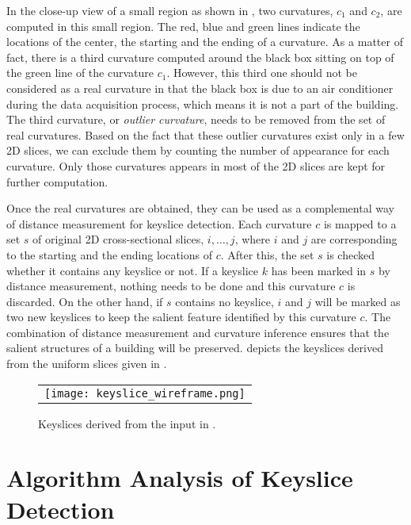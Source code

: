 In the close-up view of a small region as shown in ,
two curvatures, $c_1$ and $c_2$, are
computed in this small region. The red, blue and green lines indicate the locations
of the center, the starting and the ending of a curvature.
As a matter of fact, there is a third curvature computed around the
black box sitting on top of the green line of the curvature $c_1$.
However, this third one should not be considered as a real curvature
in that the black box is due to an air conditioner during the data acquisition process,
which means it is not a part of the building.
The third curvature, or {\it outlier curvature},
needs to be removed from the set of real curvatures.
Based on the fact that these outlier curvatures exist only in a few 2D slices,
we can exclude them by counting the number of appearance for each curvature.
Only those curvatures appears in most of the 2D slices are kept for further computation.

Once the real curvatures are obtained, they can be used as a complemental way of
 distance measurement for keyslice detection.
Each curvature $c$ is mapped to a set $s$ of original 2D cross-sectional
slices, $i,\ldots,j$, where $i$ and $j$ are corresponding to the starting and
the ending locations of $c$. After this, the set $s$ is checked whether
it contains any keyslice or not.
If a keyslice $k$ has been marked in $s$ by distance measurement,
nothing needs to be done and this curvature $c$ is discarded.
On the other hand, if $s$ contains no keyslice, $i$ and $j$ will be marked as
two new keyslices to keep the salient feature identified by this curvature $c$.
The combination of distance measurement and curvature inference
ensures that the salient structures of a building will be preserved.
 depicts the keyslices derived from the uniform slices
given in .

\begin{figure}[hbtp]
\begin{center}
\begin{tabular}{c}
\texttt{[image: keyslice\_wireframe.png]}
\end{tabular}
\end{center}
\caption{Keyslices derived from the input in .}
\label{fig:keyslices}
\end{figure}

\section{Algorithm Analysis of Keyslice Detection}
\label{sec:aa_kd}

